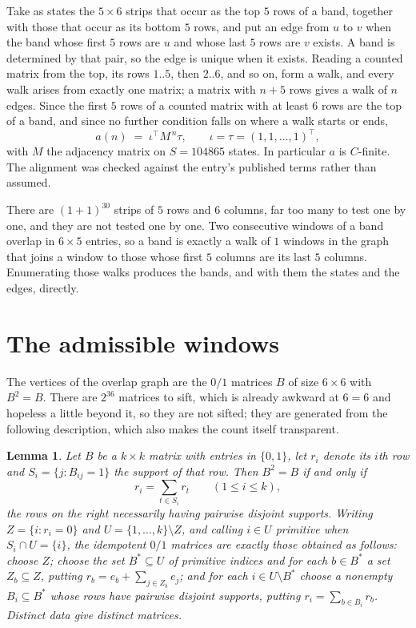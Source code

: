 \documentclass[11pt,a4paper]{article}
\theoremstyle{plain}
\newtheorem{lemma}[theorem]{Lemma}
\theoremstyle{definition}
\begin{document}
Take as states the $5\times6$ strips that occur as the top $5$ rows of a band,
together with those that occur as its bottom $5$ rows, and put an edge from $u$ to $v$
when the band whose first $5$ rows are $u$ and whose last $5$ rows are $v$ exists.
A band is determined by that pair, so the edge is unique when it exists. Reading a counted
matrix from the top, its rows $1..5$, then $2..6$, and so on, form a walk, and every
walk arises from exactly one matrix; a matrix with $n+5$ rows gives a walk of $n$ edges.
Since the first $5$ rows of a counted matrix with at least $6$ rows are the top of a
band, and since no further condition falls on where a walk starts or ends,
\[
a(n)\;=\;\iota^{\!\top}M^{\,n}\tau ,\qquad \iota=\tau=(1,1,\dots,1)^{\!\top},
\]
with $M$ the adjacency matrix on $S=104865$ states. In particular $a$ is $C$-finite. The
alignment was checked against the entry's published terms rather than assumed.

There are $(1 + 1)^{30}$ strips of $5$ rows and $6$ columns, far too
many to test one by one, and they are not tested one by one. Two consecutive windows of a band
overlap in $6\times5$ entries, so a band is exactly a walk of $1$ windows in
the graph that joins a window to those whose first $5$ columns are its last $5$
columns. Enumerating those walks produces the bands, and with them the states and the edges,
directly.

\section{The admissible windows}

The vertices of the overlap graph are the $0/1$ matrices $B$ of size $6\times6$ with
$B^2=B$. There are $2^{36}$ matrices to sift, which is already awkward at $6=6$ and
hopeless a little beyond it, so they are not sifted; they are generated from the following
description, which also makes the count itself transparent.

\begin{lemma}\label{lem:idem}
Let $B$ be a $k\times k$ matrix with entries in $\{0,1\}$, let $r_i$ denote its $i$th row and
$S_i=\{j:B_{ij}=1\}$ the support of that row. Then $B^2=B$ if and only if
\[
r_i=\sum_{t\in S_i}r_t \qquad (1\le i\le k),
\]
the rows on the right necessarily having pairwise disjoint supports. Writing
$Z=\{i:r_i=0\}$ and $U=\{1,\dots,k\}\setminus Z$, and calling $i\in U$ \emph{primitive}
when $S_i\cap U=\{i\}$, the idempotent $0/1$ matrices are exactly those obtained as follows:
choose $Z$; choose the set $B^{\ast}\subseteq U$ of primitive indices and for each
$b\in B^{\ast}$ a set $Z_b\subseteq Z$, putting $r_b=e_b+\sum_{j\in Z_b}e_j$; and for each
$i\in U\setminus B^{\ast}$ choose a nonempty $B_i\subseteq B^{\ast}$ whose rows have
pairwise disjoint supports, putting $r_i=\sum_{b\in B_i}r_b$. Distinct data give distinct
matrices.
\end{lemma}
\end{document}
